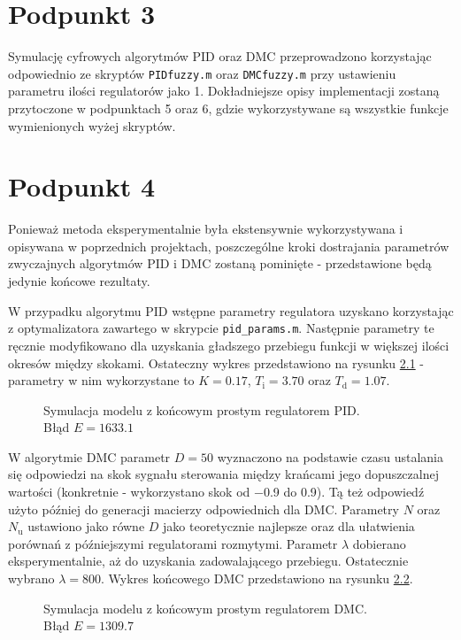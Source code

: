 \chapter{Podpunkt 3}
Symulację cyfrowych algorytmów PID oraz DMC przeprowadzono korzystając odpowiednio ze skryptów \verb|PIDfuzzy.m| oraz \verb|DMCfuzzy.m| przy ustawieniu parametru ilości regulatorów jako 1. Dokładniejsze opisy implementacji zostaną przytoczone w podpunktach 5 oraz 6, gdzie wykorzystywane są wszystkie funkcje wymienionych wyżej skryptów.


\chapter{Podpunkt 4}
Ponieważ metoda eksperymentalnie była ekstensywnie wykorzystywana i opisywana w poprzednich projektach, poszczególne kroki dostrajania parametrów zwyczajnych algorytmów PID i DMC zostaną pominięte - przedstawione będą jedynie końcowe rezultaty.

W przypadku algorytmu PID wstępne parametry regulatora uzyskano korzystając z optymalizatora zawartego w skrypcie \verb|pid_params.m|. Następnie parametry te ręcznie modyfikowano dla uzyskania gładszego przebiegu funkcji w większej ilości okresów między skokami. Ostateczny wykres przedstawiono na rysunku \ref{Z4pid} - parametry w nim wykorzystane to $ K = \num{0,17} $, $ T_\mathrm{i} = \num{3,70} $ oraz $ T_\mathrm{d} = \num{1,07} $. 

\begin{figure}[ht]
	\centering
	
	\caption{Symulacja modelu z końcowym prostym regulatorem PID.\\ Błąd $ E = \num{1633,1} $}
	\label{Z4pid}
\end{figure}

W algorytmie DMC parametr $ D = 50 $ wyznaczono na podstawie czasu ustalania się odpowiedzi na skok sygnału sterowania między krańcami jego dopuszczalnej wartości (konkretnie - wykorzystano skok od \num{-0,9} do \num{0,9}). Tą też odpowiedź użyto później do generacji macierzy odpowiednich dla DMC. Parametry $ N $ oraz $ N_\mathrm{u} $ ustawiono jako równe $ D $ jako teoretycznie najlepsze oraz dla ułatwienia porównań z późniejszymi regulatorami rozmytymi. Parametr $ \lambda $ dobierano eksperymentalnie, aż do uzyskania zadowalającego przebiegu. Ostatecznie wybrano $ \lambda = \num{800} $. Wykres końcowego DMC przedstawiono na rysunku \ref{Z4dmc}.

\begin{figure}[ht]
	\centering
	
	\caption{Symulacja modelu z końcowym prostym regulatorem DMC.\\ Błąd $ E = \num{1309,7} $}
	\label{Z4dmc}
\end{figure}

